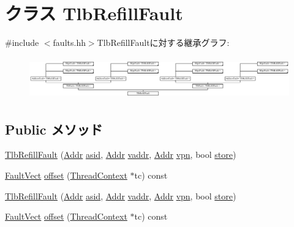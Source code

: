 \hypertarget{classMipsISA_1_1TlbRefillFault}{
\section{クラス TlbRefillFault}
\label{classMipsISA_1_1TlbRefillFault}
}


{\ttfamily \#include $<$faults.hh$>$}TlbRefillFaultに対する継承グラフ:\begin{figure}[H]
\begin{center}
\leavevmode
\includegraphics[height=1.82292cm]{classMipsISA_1_1TlbRefillFault}
\end{center}
\end{figure}
\subsection*{Public メソッド}
\begin{DoxyCompactItemize}
\item 
\hyperlink{classMipsISA_1_1TlbRefillFault_a299c6b91a14baa1c8fbcc2b2f003e2bc}{TlbRefillFault} (\hyperlink{classm5_1_1params_1_1Addr}{Addr} \hyperlink{classMipsISA_1_1TlbFault_a3bd75b410169a5c0e356fda4d021e49c}{asid}, \hyperlink{classm5_1_1params_1_1Addr}{Addr} \hyperlink{classMipsISA_1_1AddressFault_a9f933b300ef63eea367ca82f8da31025}{vaddr}, \hyperlink{classm5_1_1params_1_1Addr}{Addr} \hyperlink{classMipsISA_1_1TlbFault_ad378f7d20675898b2a5994600528fa9a}{vpn}, bool \hyperlink{classMipsISA_1_1AddressFault_a86c0e52eeb2243d66bc032096c160a0b}{store})
\item 
\hyperlink{classm5_1_1params_1_1Addr}{FaultVect} \hyperlink{classMipsISA_1_1TlbRefillFault_a9c059b781f653170e9da1d520c6d96b1}{offset} (\hyperlink{classThreadContext}{ThreadContext} $\ast$tc) const 
\item 
\hyperlink{classMipsISA_1_1TlbRefillFault_a299c6b91a14baa1c8fbcc2b2f003e2bc}{TlbRefillFault} (\hyperlink{classm5_1_1params_1_1Addr}{Addr} \hyperlink{classMipsISA_1_1TlbFault_a3bd75b410169a5c0e356fda4d021e49c}{asid}, \hyperlink{classm5_1_1params_1_1Addr}{Addr} \hyperlink{classMipsISA_1_1AddressFault_a9f933b300ef63eea367ca82f8da31025}{vaddr}, \hyperlink{classm5_1_1params_1_1Addr}{Addr} \hyperlink{classMipsISA_1_1TlbFault_ad378f7d20675898b2a5994600528fa9a}{vpn}, bool \hyperlink{classMipsISA_1_1AddressFault_a86c0e52eeb2243d66bc032096c160a0b}{store})
\item 
\hyperlink{classm5_1_1params_1_1Addr}{FaultVect} \hyperlink{classMipsISA_1_1TlbRefillFault_a9c059b781f653170e9da1d520c6d96b1}{offset} (\hyperlink{classThreadContext}{ThreadContext} $\ast$tc) const 
\end{DoxyCompactItemize}


